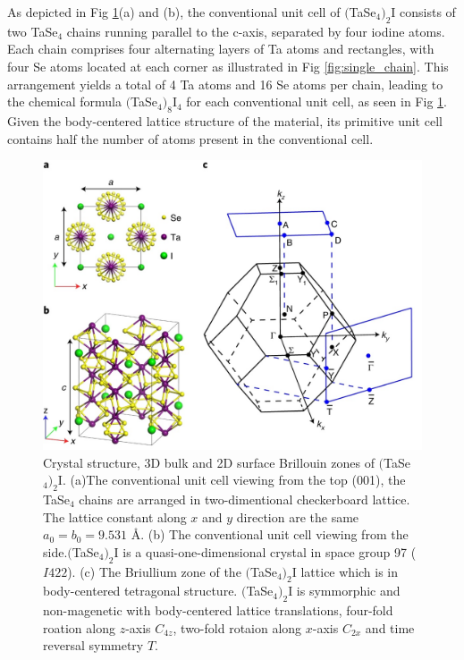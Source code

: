 As depicted in Fig \ref{fig:crystal_structure}(a) and (b), the conventional unit cell of $($TaSe$_4)_2$I consists of two TaSe$_4$ chains running parallel to the c-axis, separated by four iodine atoms. Each chain comprises four alternating layers of Ta atoms and rectangles, with four Se atoms located at each corner as illustrated in Fig \ref{fig:single_chain}. This arrangement yields a total of 4 Ta atoms and 16 Se atoms per chain, leading to the chemical formula $($TaSe$_4)_8$I$_4$ for each conventional unit cell, as seen in Fig \ref{fig:crystal_structure}. Given the body-centered lattice structure of the material, its primitive unit cell contains half the number of atoms present in the conventional cell.

\begin{figure}[h]
    \centering
    \includegraphics[width =\textwidth]{images/crystal_structure.jpg}
    \caption{Crystal structure, 3D bulk and 2D surface Brillouin zones of $($TaSe$_4)_2$I.\cite{shi2021charge}  (a)The conventional unit cell viewing from the top (001), the TaSe$_4$ chains are arranged in two-dimentional checkerboard lattice. The lattice constant along $x$ and $y$ direction are the same $a_0 = b_0= 9.531$ Å. (b) The conventional unit cell viewing from the side.$($TaSe$_4)_2$I is a quasi-one-dimensional crystal in  space group 97 ($I422$). (c) The Briullium zone of the $($TaSe$_4)_2$I lattice which is in body-centered tetragonal structure. $($TaSe$_4)_2$I is symmorphic and non-magenetic with body-centered lattice translations, four-fold roation along $z$-axis $C_{4z}$, two-fold rotaion along $x$-axis $C_{2x}$ and time reversal symmetry $T$.}
    \label{fig:crystal_structure}
\end{figure}

